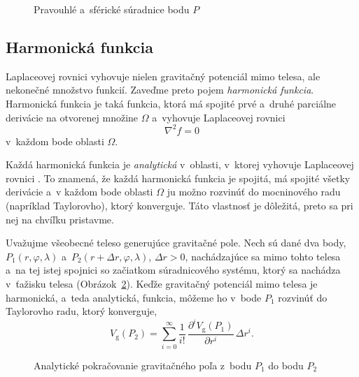 \documentclass[a4paper, 12pt]{book}
\newcommand{\gidx}{\mathrm g}
\begin{document}
\begin{figure}
\centering

\caption{Pravouhlé a~sférické súradnice bodu $P$}
\label{fig:cart_sph}
\end{figure}





\subsection{Harmonická funkcia}

Laplaceovej rovnici vyhovuje nielen gravitačný potenciál mimo telesa, ale
nekonečné množstvo funkcií.  Zaveďme preto pojem \emph{harmonická funkcia}.
Harmonická funkcia je taká funkcia, ktorá má spojité prvé a~druhé parciálne
derivácie na otvorenej množine $\Omega$ a~vyhovuje Laplaceovej rovnici
%
\begin{equation}
\nabla^2 f = 0
\end{equation}
%
v~každom bode oblasti $\Omega$.

Každá harmonická funkcia je \emph{analytická} v~oblasti, v~ktorej vyhovuje
Laplaceovej rovnici \citep{MoritzPhysicalGeodesy}.  To znamená, že každá
harmonická funkcia je spojitá, má spojité všetky derivácie a~v každom bode
oblasti $\Omega$ ju možno rozvinúť do mocninového radu (napríklad Taylorovho),
ktorý konverguje.  Táto vlastnosť je dôležitá, preto sa pri nej na chvíľku
pristavme.

Uvažujme všeobecné teleso generujúce gravitačné pole.  Nech sú dané dva body,
$P_1(r, \varphi, \lambda)$ a~$P_2(r + \Delta r, \varphi, \lambda)$, $\Delta
r > 0$, nachádzajúce sa mimo tohto telesa a~na tej istej spojnici so začiatkom
súradnicového systému, ktorý sa nachádza v~ťažisku telesa
(Obrázok~\ref{fig:analytical_continuation}).  Keďže gravitačný potenciál mimo
telesa je harmonická, a~teda analytická, funkcia, môžeme ho v~bode $P_1$
rozvinúť do Taylorovho radu, ktorý konverguje,
%
\begin{equation}
\label{eq:vg_analytical_continuation}
V_\gidx(P_2) = \sum_{i = 0}^\infty \frac{1}{i!} \, \frac{\partial^i
V_\gidx(P_1)}{\partial r^i} \, \Delta r^i{.}
\end{equation}

\begin{figure}
\centering

\caption{Analytické pokračovanie gravitačného poľa z~bodu $P_1$ do bodu $P_2$}
\label{fig:analytical_continuation}
\end{figure}
\end{document}

